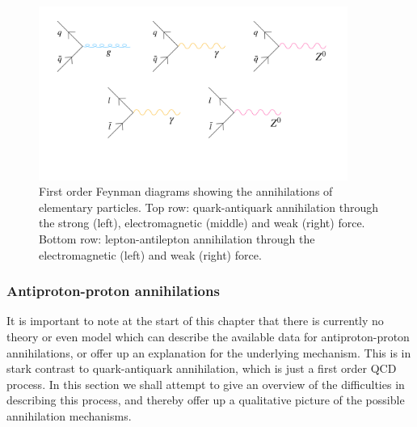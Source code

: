 \begin{figure}
    \centering
    \includegraphics[width=0.9\textwidth]{figures/Annihilation_Feynman_diagram.pdf}
    \caption{First order Feynman diagrams showing the annihilations of elementary particles. Top row: quark-antiquark annihilation through the strong (left), electromagnetic (middle) and weak (right) force. Bottom row: lepton-antilepton annihilation through the electromagnetic (left) and weak (right) force.}
    \label{fig:annihilationsFeynmanElementary}
\end{figure}

\subsubsection{Antiproton-proton annihilations}
It is important to note at the start of this chapter that there is currently no theory or even model which can describe the available data for antiproton-proton annihilations, or offer up an explanation for the underlying mechanism\cite{}. This is in stark contrast to quark-antiquark annihilation, which is just a first order QCD process. In this section we shall attempt to give an overview of the difficulties in describing this process, and thereby offer up a qualitative picture of the possible annihilation mechanisms.\\

